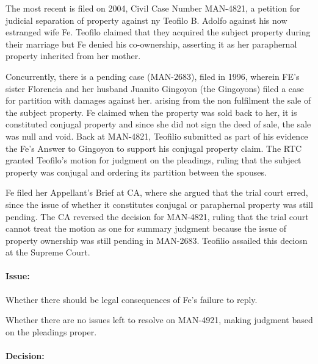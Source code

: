 \documentclass[
12pt,
oneside,
onehalfspacing,
headsepline
]{DigestCollection}
\begin{document}
The most recent is filed on 2004, Civil Case Number MAN-4821, a petition for judicial separation of property against ny Teofilo B. Adolfo against his now estranged wife Fe. Teofilo claimed that they acquired the subject property during their marriage but Fe denied his co-ownership, asserting it as her paraphernal property inherited from her mother. 

Concurrently, there is a pending case (MAN-2683), filed in 1996, wherein FE’s sister Florencia and her husband Juanito Gingoyon (the Gingoyons) filed a case for partition with damages against her. arising from the non fulfilment the sale of the subject property. Fe claimed when the property was sold back to her, it is constituted conjugal property and since she did not sign the deed of sale, the sale was null and void. Back at MAN-4821, Teofilio submitted as part of his evidence the Fe's Answer to Gingoyon to support his conjugal property claim. The RTC granted Teofilo's motion for judgment on the pleadings, ruling that the subject property was conjugal and ordering its partition between the spouses. 

Fe filed her Appellant’s Brief at CA, where she argued that the trial court erred, since the issue of whether it constitutes conjugal or paraphernal property was still pending. The CA reversed the decision for MAN-4821, ruling that the trial court cannot treat the motion as one for summary judgment because the issue of property ownership was still pending in MAN-2683. Teofilio assailed this deciosn at the Supreme Court.

\paragraph{Issue:}
\label{54e43e40-122c-11ef-aa24-9916ea601717}


Whether there should be legal consequences of Fe's failure to reply.

Whether there are no issues left to resolve on MAN-4921, making judgment based on the pleadings proper.

\paragraph{Decision:}
\label{56d2c7d0-122c-11ef-aa24-9916ea601717}
\end{document}
